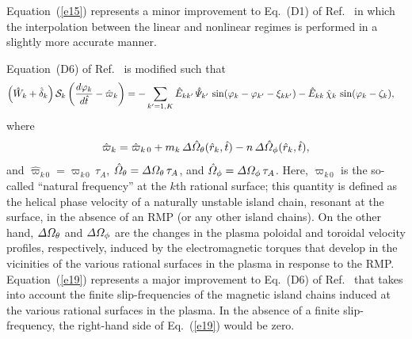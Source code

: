 \documentclass[12pt,prb,aps]{revtex4-1}
\begin{document}
Equation~(\ref{e15}) represents a minor improvement to Eq.~(D1) of Ref.~ in which the interpolation between the
linear and nonlinear regimes is performed in a slightly more accurate manner. 

Equation~(D6) of Ref.~ is modified such that
\begin{align}\label{e19}
\left(\hat{W}_k +\hat{\delta}_k\right){\cal S}_k\left(\frac{d\varphi_k}{d\hat{t}}-\hat{\varpi}_k\right)&=
- \sum_{k'=1,K}\hat{E}_{kk'}\,\hat{\mit\Psi}_{k'}\,\sin(\varphi_k-\varphi_{k'}-\xi_{kk'})-\hat{E}_{kk}\,\hat{\chi}_k\,\sin(\varphi_k-\zeta_k),
\end{align}
where
\begin{equation}
\hat{\varpi}_k= \hat{\varpi}_{k\,0}+m_k\,{\mit\Delta}\hat{\mit\Omega}_\theta(\hat{r}_k,\hat{t})-n\,{\mit\Delta}\hat{\mit\Omega}_\phi(\hat{r}_k,\hat{t}),
\end{equation}
and $\hat{\varpi}_{k\,0}= \varpi_{k\,0}\,\tau_A$, $\hat{\mit\Omega}_\theta= {\mit\Delta}{\mit\Omega}_\theta\,\tau_A$, and $\hat{\mit\Omega}_\phi= {\mit\Delta}{\mit\Omega}_\phi\,\tau_A$. Here, $\varpi_{k\,0}$
is the so-called ``natural frequency'' at the $k$th rational surface; this quantity is defined as the helical phase velocity of a naturally unstable island chain, resonant at the surface, in the
absence of an RMP (or any other island chains). On the other hand,  ${\mit\Delta}{\mit\Omega}_\theta$ and ${\mit\Delta}{\mit\Omega}_\phi$ are the changes in the plasma
poloidal and toroidal velocity profiles, respectively, induced by the electromagnetic torques that develop in the vicinities of the various rational surfaces in the plasma in response to the RMP.
Equation~(\ref{e19}) represents
a major improvement to Eq.~(D6) of Ref.~ that takes into  account the finite slip-frequencies of the magnetic island chains induced at
the various rational surfaces in the plasma. In the absence of a finite slip-frequency, the right-hand side of Eq.~(\ref{e19}) would be zero. 
\end{document}
